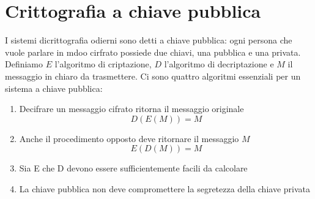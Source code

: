 \documentclass[italian,A4,12pt]{article}
\begin{document}
  \section{Crittografia a chiave pubblica}
    I sistemi dicrittografia odierni sono detti a chiave pubblica: ogni persona che vuole parlare in mdoo cirfrato possiede due chiavi, una pubblica e una privata.\\
    Definiamo $E$ l'algoritmo di criptazione, $D$ l'algoritmo di decriptazione e $M$ il messaggio in chiaro da trasmettere. Ci sono quattro algoritmi essenziali per un sistema a chiave pubblica:
    \begin{enumerate}[label=(\alph*)]
      \item Decifrare un messaggio cifrato ritorna il messaggio originale $$D(E(M))=M$$
      \item Anche il procedimento opposto deve ritornare il messaggio $M$ $$E(D(M))=M$$
      \item Sia E che D devono essere sufficientemente facili da calcolare
      \item La chiave pubblica non deve compromettere la segretezza della chiave privata
    \end{enumerate}
\end{document}
